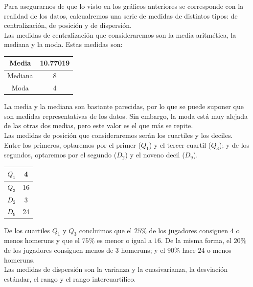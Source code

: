 \documentclass[12pt,a4paper,twoside,openright,titlepage,final]{article}
\begin{document}
Para asegurarnos de que lo visto en los gráficos anteriores se corresponde con la realidad de los datos, calcualremos una serie de medidas de distintos tipos: de centralización, de posición y de dispersión. \\

Las medidas de centralización que consideraremos son la media aritmética, la mediana y la moda. Estas medidas son:

\begin{table}[htbp]
\centering
\begin{tabular}{|c|c|}
\hline Media & 10.77019 \\ 
\hline Mediana & 8 \\ 
\hline Moda & 4  \\ 
\hline 
\end{tabular} 
\end{table}

La media y la mediana son bastante parecidas, por lo que se puede suponer que son medidas representativas de los datos. Sin embargo, la moda está muy alejada de las otras dos medias, pero este valor es el que más se repite.\\


Las medidas de posición que consideraremos serán los cuartiles y los deciles. Entre los primeros, optaremos por el primer ($Q_1$) y el tercer cuartil ($Q_3$); y de los segundos, optaremos por el segundo ($D_2$) y el noveno decil ($D_{9}$). \\

\begin{table}[htbp]
\centering
\begin{tabular}{|c|c|}
\hline $Q_1$ & 4 \\ 
\hline $Q_3$ & 16 \\ 
\hline $D_2$& 3  \\ 
\hline $D_9$& 24  \\ 
\hline 
\end{tabular} 
\end{table}

De los cuartiles $Q_1$ y $Q_3$ concluimos que el $25\%$ de los jugadores consiguen $4$ o menos homeruns y que el $75 \%$ es menor o igual a $16$. De la misma forma, el $20\%$ de los jugadores consiguen menos de $3$ homeruns; y el $90\%$ hace $24$ o menos homeruns.\\

Las medidas de dispersión son la varianza y la cuasivarianza, la desviación estándar, el rango y el rango intercuartílico.\\
\end{document}
